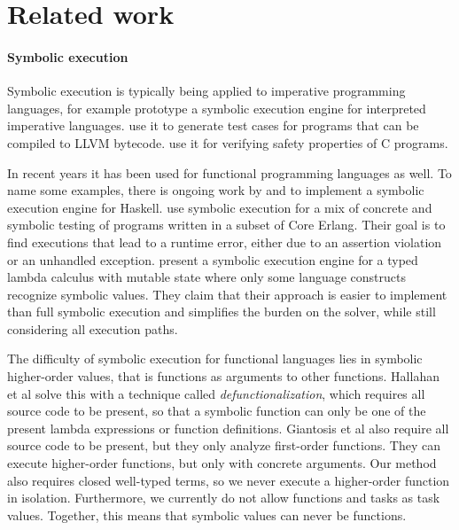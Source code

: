 


\section{Related work}
\label{sec:relatedwork}

\paragraph{Symbolic execution}
Symbolic execution \cite{King1975,Boyer1975} is typically being applied to imperative programming languages, for example \citet{BucurKC2014} prototype a symbolic execution engine for interpreted imperative languages.
\citet{CadarDE2008} use it to generate test cases for programs that can be compiled to LLVM bytecode.
\citet{JaffarMNS2012} use it for verifying safety properties of C programs.

In recent years it has been used for functional programming languages as well.
To name some examples, there is ongoing work by \citet{HallahanXP2017} and \citet{Xue2019} to implement a symbolic execution engine for Haskell.
\citet{GiantsiosPS2017} use symbolic execution for a mix of concrete and symbolic testing of programs written in a subset of Core Erlang.
Their goal is to find executions that lead to a runtime error, either due to an assertion violation or an unhandled exception.
\citet{ChangKT2018} present a symbolic execution engine for a typed lambda calculus with mutable state where only some language constructs recognize symbolic values.
They claim that their approach is easier to implement than full symbolic execution and simplifies the burden on the solver, while still considering all execution paths.

The difficulty of symbolic execution for functional languages lies in symbolic higher-order values, that is functions as arguments to other functions.
Hallahan et al solve this with a technique called \emph{defunctionalization}, which requires all source code to be present, so that a symbolic function can only be one of the present lambda expressions or function definitions.
Giantosis et al also require all source code to be present, but they only analyze first-order functions.
They can execute higher-order functions, but only with concrete arguments.
Our method also requires closed well-typed terms, so we never execute a higher-order function in isolation.
Furthermore, we currently do not allow functions and tasks as task values.
Together, this means that symbolic values can never be functions.



